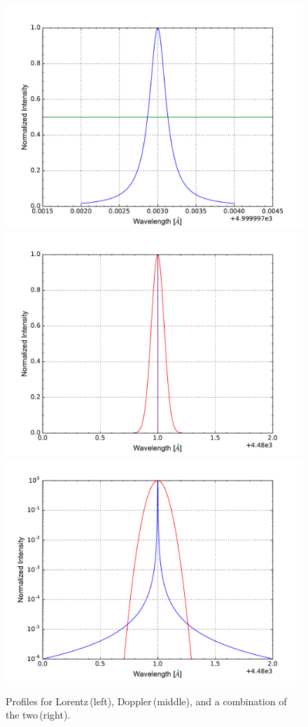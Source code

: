 \documentclass[onecolumn]{aastex6}
\begin{document}
\begin{figure}[ht]
  \centering
  \includegraphics[scale=0.3]{nat1.pdf}%
  \includegraphics[scale=0.3]{withoutshift.pdf}%
  \includegraphics[scale=0.3]{dopper.pdf} \\%

  \caption{Profiles for Lorentz\,(left), Doppler\,(middle), and a combination of the two\,(right).}
  \label{broadening}
\end{figure}
\end{document}
